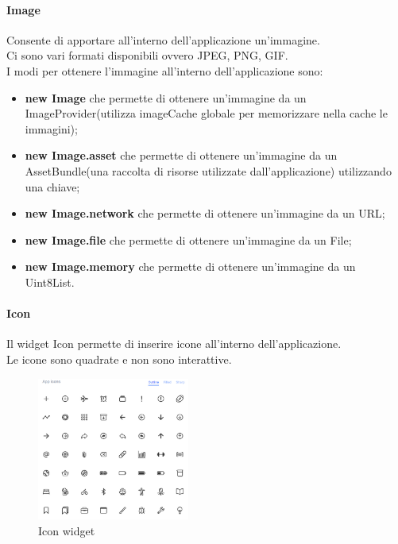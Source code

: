 \paragraph{Image}
Consente di apportare all'interno dell'applicazione un'immagine.\\
Ci sono vari formati disponibili ovvero JPEG, PNG, GIF.\\
I modi per ottenere l'immagine all'interno dell'applicazione sono:
\begin{itemize}
	\item \textbf{new Image} che permette di ottenere un'immagine da un  ImageProvider(utilizza imageCache globale per memorizzare nella cache le immagini);   
	\item \textbf{new Image.asset} che permette di ottenere un'immagine da un AssetBundle(una raccolta di risorse utilizzate dall'applicazione) utilizzando una chiave;
	\item \textbf{new Image.network} che permette di ottenere un'immagine da un URL;   
	\item \textbf{new Image.file} che permette di ottenere un'immagine da un File;
	\item \textbf{new Image.memory} che permette di ottenere un'immagine da un Uint8List.
\end{itemize}

\paragraph{Icon}
Il widget Icon permette di inserire icone all'interno dell'applicazione.\\
Le icone sono quadrate e non sono interattive.
\begin{figure}[htbp]	
	\centering
	\includegraphics[width=5cm]{immagini/icon.png}
	\caption{Icon widget}
	\label{fig:Icon widget}
\end{figure}

